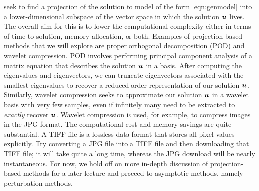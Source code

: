  seek to find a projection of the solution to model of the form \ref{eqn:genmodel} into a lower-dimensional subspace of the vector space in which the solution $\boldsymbol{u}$ lives. The overall aim for this is to lower the computational complexity either in terms of time to solution, memory allocation, or both. Examples of projection-based methods that we will explore are proper orthogonal decomposition (POD) and wavelet compression. POD involves performing principal component analysis of a matrix equation that describes the solution $\boldsymbol{u}$ in a basis. After computing the eigenvalues and eigenvectors, we can truncate eigenvectors associated with the smallest eigenvalues to recover a reduced-order representation of our solution $\boldsymbol{u}$. Similarly, wavelet compression seeks to approximate our solution $\boldsymbol{u}$ in a wavelet basis with very few samples, even if infinitely many need to be extracted to \textit{exactly} recover $\boldsymbol{u}$. Wavelet compression is used, for example, to compress images in the JPG format. The computational cost and memory savings are quite substantial. A TIFF file is a lossless data format that stores all pixel values explicitly. Try converting a JPG file into a TIFF file and then downloading that TIFF file; it will take quite a long time, whereas the JPG download will be nearly instantaneous. For now, we hold off on more in-depth discussion of projection-based methods for a later lecture and proceed to asymptotic methods, namely perturbation methods.

